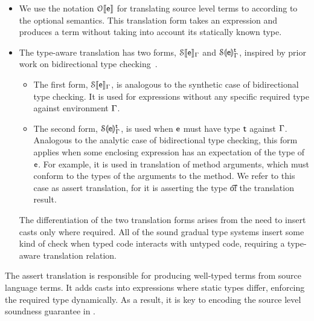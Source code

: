 \documentclass[USenglish]{tex/lipics-v2016}
\begin{document}
\begin{itemize}
  \item We use the notation $\TR[\OTS]\e$ for translating source level terms to \kafka
  according to the optional semantics. This translation form takes an expression \e and
  produces a \kafka term without taking into account its statically known type.

  \item The type-aware translation has two forms, $\TRG[\SOMS]\e\Env$ and
  $\TAG[\SOMS]\e\Env\t$, inspired by prior work on bidirectional type
  checking~\cite{pierce:1998:local}. 

  \begin{itemize}
    \item The first form, $\TRG[\SOMS]\e\Env$, is analogous to the synthetic case of bidirectional type checking.
    It is used for expressions \e without any specific required type against environment $\Gamma$.
    \item The second form, $\TAG[\SOMS]\e\Env\t$, is used when $\e$ must have type $\t$ against $\Gamma$.
    Analogous to the analytic case of bidirectional type checking, this form applies when some enclosing
    expression has an expectation of the type of $\e$. For example, it is used in translation of method
    arguments, which must conform to the types of the arguments to the method. We refer to this case
    as assert translation, for it is asserting the type \t of the translation result.
  \end{itemize}

  The differentiation of the two translation forms arises from the need to insert casts
  only where required. All of the sound gradual type systems insert some kind of
  check when typed code interacts with untyped code, requiring a type-aware translation
  relation.
\end{itemize}

The assert translation is responsible for producing well-typed \kafka
terms from source language terms. It adds casts into expressions where static
types differ, enforcing the required type dynamically. As a result, it is key
to encoding the source level soundness guarantee in \kafka.
\end{document}
